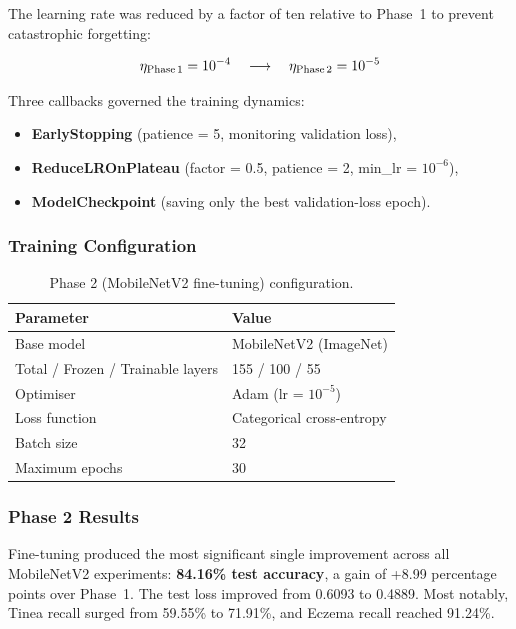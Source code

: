 The learning rate was reduced by a factor of ten relative to Phase~1 to prevent catastrophic forgetting:

\[
\eta_{\text{Phase\,1}} = 10^{-4} \quad \longrightarrow \quad \eta_{\text{Phase\,2}} = 10^{-5}
\]

Three callbacks governed the training dynamics:
\begin{itemize}
    \item \textbf{EarlyStopping} (patience = 5, monitoring validation loss),
    \item \textbf{ReduceLROnPlateau} (factor = 0.5, patience = 2, min\_lr = $10^{-6}$),
    \item \textbf{ModelCheckpoint} (saving only the best validation-loss epoch).
\end{itemize}

\subsubsection{Training Configuration}

\begin{table}[H]
\centering
\caption{Phase 2 (MobileNetV2 fine-tuning) configuration.}
\label{tab:phase2_config}
\begin{tabular}{|l|l|}
\hline
\textbf{Parameter} & \textbf{Value} \\ \hline
Base model & MobileNetV2 (ImageNet) \\ \hline
Total / Frozen / Trainable layers & 155 / 100 / 55 \\ \hline
Optimiser & Adam (lr = $10^{-5}$) \\ \hline
Loss function & Categorical cross-entropy \\ \hline
Batch size & 32 \\ \hline
Maximum epochs & 30 \\ \hline
\end{tabular}
\end{table}

\subsubsection{Phase 2 Results}

Fine-tuning produced the most significant single improvement across all MobileNetV2 experiments: \textbf{84.16\% test accuracy}, a gain of +8.99 percentage points over Phase~1. The test loss improved from 0.6093 to 0.4889. Most notably, Tinea recall surged from 59.55\% to 71.91\%, and Eczema recall reached 91.24\%.

